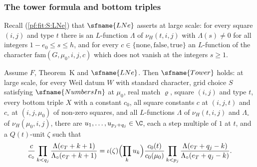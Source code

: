 \subsubsection{The tower formula and bottom triples}

Recall (\cref{pf:fit:S:LNe}) that $\sfname{LNe}$ asserts at large scale: for every square $(i,j)$ and type $t$ there is an
$L$-function $\Lambda$ of $\nu_H(t,i,j)$ with $\Lambda(s)\ne0$ for all integers $1-e_0\le s\le h$, and for every
$c\in\{\mathrm{none},\mathrm{false},\mathrm{true}\}$ an $L$-function of the character $\mathrm{fam}(G,\mu_0,i,j,c)$ which does
not vanish at the integers $s\ge1$.

\begin{theorem}\label{pf:sh-theta:towerthm}
Assume $F$, Theorem~K and $\sfname{LNe}$. Then $\sfname{Tower}$ holds: at large scale, for every Weil datum $W$ with standard
character, grid choice $S$ satisfying $\sfname{NumbersIn}$ at $\mu_0$, real match $\varrho$, square $(i,j)$ and type $t$,
every bottom triple $X$ with a constant $c_0$, all square constants $c$ at $(i,j,t)$ and $c_\circ$ at $(i,j,\mu_0)$ of
non-zero squares, and all $L$-functions $\Lambda$ of $\nu_H(t,i,j)$ and $\Lambda_\circ$ of $\nu_H(\mu_0,i,j)$, there are
$u_1,\dots,u_{p_j+q_j}\in\C$, each a step multiple of $1$ at $t$, and a $Q(t)$-unit $\zeta$ such that
\begin{equation}\label{eq:pf:sh-theta:tower}
\frac c{c_\circ}\prod_{k<q_j}\frac{\Lambda(e_T+k+1)}{\Lambda_\circ(e_T+k+1)}
=\iota(\zeta)\Bigl(\prod_ku_k\Bigr)\frac{c_0(t)}{c_0(\mu_0)}\prod_{k<p_j}\frac{\Lambda(e_T+q_j-k)}{\Lambda_\circ(e_T+q_j-k)}.
\end{equation}
\end{theorem}

